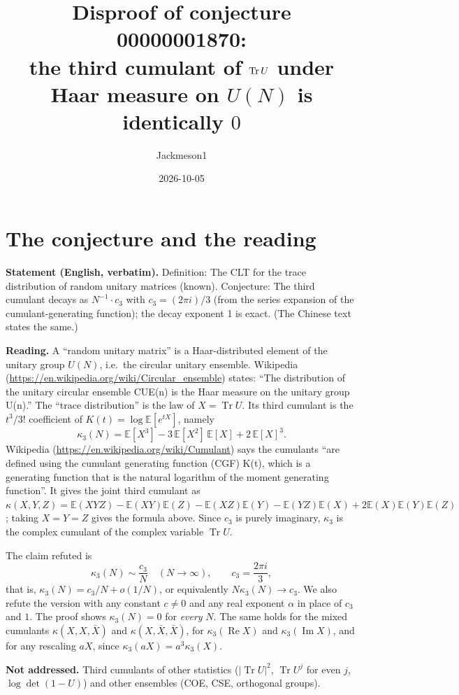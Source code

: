 \documentclass[11pt]{article}
\title{Disproof of conjecture 00000001870:\\ the third cumulant of $\Tr U$ under Haar measure on $U(N)$ is identically $0$}
\author{Jackmeson1}
\date{2026-10-05}
\theoremstyle{definition}
\newcommand{\Tr}{\operatorname{Tr}}
\newcommand{\E}{\mathbb{E}}
\begin{document}
\maketitle

\section{The conjecture and the reading}

\textbf{Statement (English, verbatim).} Definition: The CLT for the trace distribution of random
unitary matrices (known). Conjecture: The third cumulant decays as $N^{-1}\cdot c_3$ with
$c_3 = (2\pi i)/3$ (from the series expansion of the cumulant-generating function); the decay
exponent 1 is exact. (The Chinese text states the same.)

\textbf{Reading.} A ``random unitary matrix'' is a Haar-distributed element of the unitary group
$U(N)$, i.e.\ the circular unitary ensemble. Wikipedia
(\url{https://en.wikipedia.org/wiki/Circular_ensemble}) states: ``The distribution of the unitary
circular ensemble CUE(n) is the Haar measure on the unitary group U(n).'' The ``trace
distribution'' is the law of $X = \Tr U$. Its third cumulant is the $t^3/3!$ coefficient of
$K(t)=\log\E[e^{tX}]$, namely
\[
  \kappa_3(N) = \E[X^3] - 3\,\E[X^2]\,\E[X] + 2\,\E[X]^3 .
\]
Wikipedia (\url{https://en.wikipedia.org/wiki/Cumulant}) says the cumulants ``are defined using the
cumulant generating function (CGF) K(t), which is a generating function that is the natural
logarithm of the moment generating function''. It gives the joint third cumulant as
$\kappa(X,Y,Z)=\E(XYZ)-\E(XY)\E(Z)-\E(XZ)\E(Y)-\E(YZ)\E(X)+2\E(X)\E(Y)\E(Z)$; taking
$X=Y=Z$ gives the formula above. Since $c_3$ is purely imaginary, $\kappa_3$ is the complex
cumulant of the complex variable $\Tr U$.

The claim refuted is
\[
  \kappa_3(N) \sim \frac{c_3}{N}\quad (N\to\infty),\qquad c_3=\frac{2\pi i}{3},
\]
that is, $\kappa_3(N)=c_3/N+o(1/N)$, or equivalently $N\kappa_3(N)\to c_3$. We also refute the
version with any constant $c\ne 0$ and any real exponent $\alpha$ in place of $c_3$ and $1$. The
proof shows $\kappa_3(N)=0$ for \emph{every} $N$. The same holds for the mixed cumulants
$\kappa(X,X,\bar X)$ and $\kappa(X,\bar X,\bar X)$, for $\kappa_3(\operatorname{Re}X)$ and
$\kappa_3(\operatorname{Im}X)$, and for any rescaling $aX$, since $\kappa_3(aX)=a^3\kappa_3(X)$.

\textbf{Not addressed.} Third cumulants of other statistics ($|\Tr U|^2$, $\Tr U^j$ for even $j$,
$\log\det(1-U)$) and other ensembles (COE, CSE, orthogonal groups).
\end{document}
